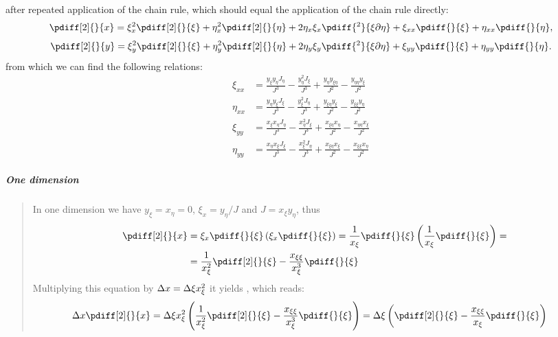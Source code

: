 %
after repeated application of the chain rule, which should equal the application of the chain rule directly:
%
\begin{align}\label{2orderpartialtransxfinal}
	\pdiff[2]{}{x}
	= \xi_x^2 \pdiff[2]{}{\xi}
	+ \eta_x^2 \pdiff[2]{}{\eta}
	+ 2\eta_x\xi_x \pdiff{^2}{\xi \partial \eta}
	+ \xi_{xx} \pdiff{}{\xi}
	+ \eta_{xx} \pdiff{}{\eta},
\end{align}
%
\begin{align}\label{2orderpartialtransyfinal}
	\pdiff[2]{}{y}
	= \xi_y^2 \pdiff[2]{}{\xi}
	+ \eta_y^2 \pdiff[2]{}{\eta}
	+ 2\eta_y\xi_y\pdiff{^2}{\xi \partial \eta}
	+ \xi_{yy} \pdiff{}{\xi}
	+ \eta_{yy}\pdiff{}{\eta}.
\end{align}
%
from which we can find the following relations:
%
\begin{align}
		\xi_{xx} &=
		\frac{y_{\xi} y_{\eta}J_{\eta}}{J^3}
		- \frac{y_{\eta}^2 J_{\xi}}{J^3}
		+ \frac{y_{\eta}y_{\xi\eta}}{J^2}
		-  \frac{y_{\eta \eta} y_{\xi}}{J^2} \\
		\eta_{xx} &=
		\frac{y_{\eta} y_{\xi} J_{\xi}}{J^3}
		- \frac{y_{\xi}^2 J_{\eta}}{J^3}
		+  \frac{y_{\xi \eta}y_{\xi}}{J^2}
		- \frac{ y_{\xi\xi} y_{\eta}}{J^2} \\
		\xi_{yy} &=
		\frac{x_{\xi}x_{\eta}J_{\eta}}{J^3}
		-\frac{x_{\eta}^2J_{\xi}}{J^3}
		+ \frac{x_{\xi\eta} x_{\eta}}{J^2}
		- \frac{x_{\eta\eta}x_{\xi}}{J^2} \\
		\eta_{yy} &=
		\frac{x_{\eta}x_{\xi}J_{\xi}}{J^3}
		- \frac{ x_{\xi}^2J_{\eta}}{J^3}
		+ \frac{x_{\xi\eta}x_{\xi}}{J^2}
		- \frac{x_{\xi \xi}x_{\eta}}{J^2}
\end{align}
\subparagraph*{One dimension}
\begin{quote}
{\scriptsize
In one dimension we have $y_\xi = x_\eta = 0$, $\xi_x = y_\eta/J$ and $J = x_\xi y_\eta$, thus
\begin{align}
    \pdiff[2]{}{x}
    & =\xi_x\pdiff{}{\xi}\left(  \xi_x\pdiff{}{\xi} \right)
      =\frac{1}{x_\xi}\pdiff{}{\xi}\left( \frac{1}{x_\xi} \pdiff{}{\xi} \right) =
    \\
    & =\frac{1}{x_\xi^2} \pdiff[2]{}{\xi} - \frac{x_{\xi\xi}}{x_\xi^3}\pdiff{}{\xi}
\end{align}
Multiplying this equation by $\Delta x = \Delta \xi x_\xi^2$ it yields \citet[eq.\ 2]{Borsboom1998}, which reads:
\begin{align}
    \Dx \pdiff[2]{}{x}
& = \Dxi x_\xi^2 \left( \frac{1}{x_\xi^2} \pdiff[2]{}{\xi} - \frac{x_{\xi\xi}}{x_\xi^3}\pdiff{}{\xi} \right)
=
\Dxi \left( \pdiff[2]{}{\xi} - \frac{x_{\xi\xi}}{x_\xi}\pdiff{}{\xi} \right)
\end{align}
}
\end{quote}
